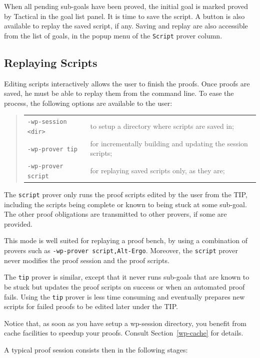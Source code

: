 When all pending sub-goals have been proved, the initial goal is marked proved by \textsf{Tactical} in the goal list panel. It is time to save the script. A button is also available to replay the saved script, if any. Saving and replay are also accessible from the list of goals, in the popup menu of the \texttt{Script} prover column.

\subsection{Replaying Scripts}

Editing scripts interactively allows the user to finish the proofs. Once proofs are saved, he must be able to replay them from the command line. To ease the process, the following options are available to the user:
\begin{quote}
\begin{tabular}{ll}
\verb+-wp-session <dir>+ & to setup a directory where scripts are saved in; \\
\verb+-wp-prover tip+ & for incrementally building and updating the session scripts;\\
\verb+-wp-prover script+ & for replaying saved scripts only, as they are;\\
\end{tabular}
\end{quote}

The \verb+script+ prover only runs the proof scripts edited by the user from the TIP, including the scripts being complete or known to being stuck at some sub-goal. The other proof obligations are transmitted to other provers, if some are provided.

This mode is well suited for replaying a proof bench, by using a combination of provers such as \verb+-wp-prover script,Alt-Ergo+. Moreover, the \verb+script+ prover never modifies the proof session and the proof scripts.

The \verb+tip+ prover is similar, except that it never runs sub-goals that are known to be stuck but updates the proof scripts on success or when an automated proof fails. Using the \verb+tip+ prover is less time consuming and eventually prepares new scripts for failed proofs to be edited later under the TIP.

Notice that, as soon as you have setup a wp-session directory, you benefit from cache facilities to speedup your proofs. Consult Section~\ref{wp-cache} for details.

\clearpage
A typical proof session consists then in the following stages:


